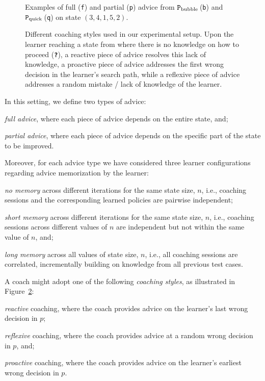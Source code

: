 \documentclass[a4paper,twoside]{article}
\newcommand{\bubblecoach}{\ensuremath{\texttt{P}_{\rm bubble}}\,}
\newcommand{\quickcoach}{\ensuremath{\texttt{P}_{\rm quick}}\,}
\newcommand{\qmark}{\texttt{\textbf{?}}}
\begin{document}
\begin{figure}[!tb]
	\centering
	
	\caption{Examples of full (\texttt{f}) and partial (\texttt{p}) advice from \bubblecoach (\texttt{b}) and \quickcoach (\texttt{q}) on state $(3,4,1,5,2)$.}
	\label{fig:sorting rules}
\end{figure}

\begin{figure}[!tb]
	\centering
	
	\caption{Different coaching styles used in our experimental setup. Upon the learner reaching a state from where there is no knowledge on how to proceed (\textcolor{unknownColor}{\qmark}), a reactive piece of advice resolves this lack of knowledge, a proactive piece of advice addresses the first wrong decision in the learner's search path, while a reflexive piece of advice addresses a random mistake / lack of knowledge of the learner.}
	\label{fig:coaching styles}
\end{figure}

In this setting, we define two types of advice:
\begin{enumerate*}[label=(A\arabic*)]
	\item \emph{full advice}, where each piece of advice depends on the entire state, and;
	\item \emph{partial advice}, where each piece of advice depends on the specific part of the state to be improved.
\end{enumerate*}
Moreover, for each advice type we have considered three learner configurations regarding advice memorization by the learner:
\begin{enumerate*}[label=(M\arabic*)]
	\item \emph{no memory} across different iterations for the same state size, $n$, i.e., coaching sessions and the corresponding learned policies are pairwise independent;
	\item \emph{short memory} across different iterations for the same state size, $n$, i.e., coaching sessions across different values of $n$ are independent but not within the same value of $n$, and;
	\item \emph{long memory} across all values of state size, $n$, i.e., all coaching sessions are correlated, incrementally building on knowledge from all previous test cases.
\end{enumerate*}
A coach might adopt one of the following \emph{coaching styles}, as illustrated in Figure~\ref{fig:coaching styles}:
\begin{enumerate*}[label=(C\arabic*)]
	\item \emph{reactive} coaching, where the coach provides advice on the learner's last wrong decision in $p$;
	\item \emph{reflexive} coaching, where the coach provides advice at a random wrong decision in $p$, and;
	\item \emph{proactive} coaching, where the coach provides advice on the learner's earliest wrong decision in $p$.
\end{enumerate*}
\end{document}
